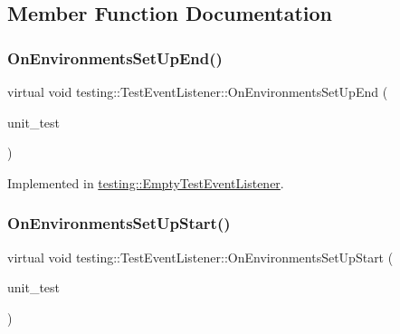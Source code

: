 \subsection{Member Function Documentation}
\mbox{\label{classtesting_1_1TestEventListener_aaa1021d75f5dbf3f05c829c1cc520341}} 
\subsubsection{\texorpdfstring{On\+Environments\+Set\+Up\+End()}{OnEnvironmentsSetUpEnd()}}
{\footnotesize\ttfamily virtual void testing\+::\+Test\+Event\+Listener\+::\+On\+Environments\+Set\+Up\+End (\begin{DoxyParamCaption}\item[{const \hyperlink{classtesting_1_1UnitTest}{Unit\+Test} \&}]{unit\+\_\+test }\end{DoxyParamCaption})\hspace{0.3cm}{\ttfamily [pure virtual]}}



Implemented in \hyperlink{classtesting_1_1EmptyTestEventListener_a9b4e781c0b38065a55c2fd163724ba69}{testing\+::\+Empty\+Test\+Event\+Listener}.

\mbox{\label{classtesting_1_1TestEventListener_aa6502e534919605be45f26a6daf9a40c}} 
\subsubsection{\texorpdfstring{On\+Environments\+Set\+Up\+Start()}{OnEnvironmentsSetUpStart()}}
{\footnotesize\ttfamily virtual void testing\+::\+Test\+Event\+Listener\+::\+On\+Environments\+Set\+Up\+Start (\begin{DoxyParamCaption}\item[{const \hyperlink{classtesting_1_1UnitTest}{Unit\+Test} \&}]{unit\+\_\+test }\end{DoxyParamCaption})\hspace{0.3cm}{\ttfamily [pure virtual]}}



